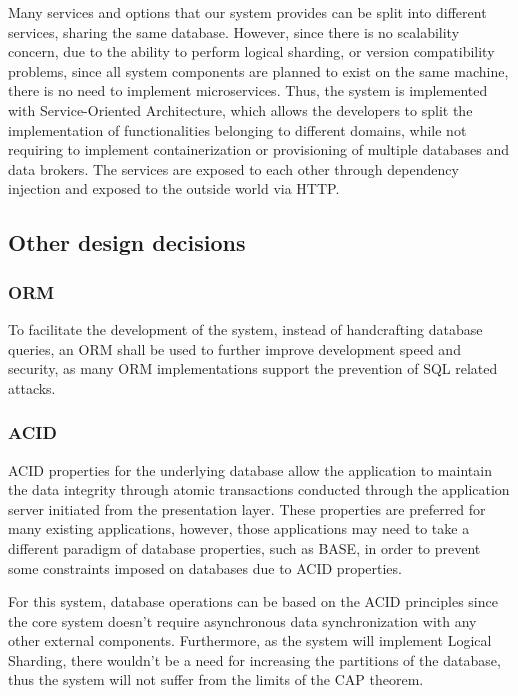 
Many services and options that our system provides can be split into different services, sharing the same database.
However, since there is no scalability concern, due to the ability to perform logical sharding, or version compatibility problems, since all system components are planned to exist on the same machine, there is no need to implement microservices.
Thus, the system is implemented with Service-Oriented Architecture, which allows the developers to split the implementation of functionalities belonging to different domains, while not requiring to implement containerization or provisioning of multiple databases and data brokers.
The services are exposed to each other through dependency injection and exposed to the outside world via HTTP.

\subsection{Other design decisions} %

\subsubsection{ORM}
To facilitate the development of the system, instead of handcrafting database queries, an ORM shall be used to further improve development speed and security, as many ORM implementations support the prevention of SQL related attacks.

\subsubsection{ACID}

ACID properties for the underlying database allow the application to maintain the data integrity through atomic transactions conducted through the application server initiated from the presentation layer.
These properties are preferred for many existing applications, however, those applications may need to take a different paradigm of database properties, such as BASE, in order to prevent some constraints imposed on databases due to ACID properties.

For this system, database operations can be based on the ACID principles since the core system doesn't require asynchronous data synchronization with any other external components.
Furthermore, as the system will implement Logical Sharding, there wouldn't be a need for increasing the partitions of the database, thus the system will not suffer from the limits of the CAP theorem.

